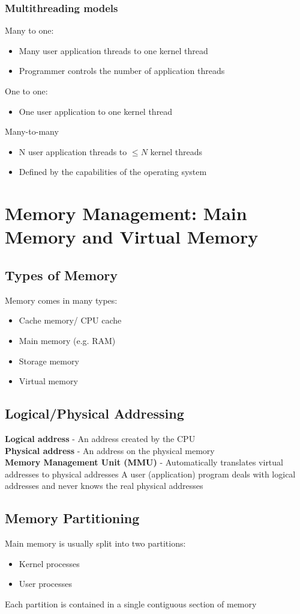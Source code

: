 \documentclass{article}[18pt]
\begin{document}
\subsubsection{Multithreading models}
Many to one:
\begin{itemize}
	\item Many user application threads to one kernel thread
	\item Programmer controls the number of application threads
\end{itemize}
One to one:
\begin{itemize}
	\item One user application to one kernel thread
\end{itemize}
Many-to-many
\begin{itemize}
	\item N user application threads to $\leqslant N$ kernel threads
	\item Defined by the capabilities of the operating system
\end{itemize}
\section{Memory Management: Main Memory and Virtual Memory}
\subsection{Types of Memory}
Memory comes in many types:
\begin{itemize}
	\item Cache memory/ CPU cache
	\item Main memory (e.g. RAM)
	\item Storage memory
	\item Virtual memory
\end{itemize}
\subsection{Logical/Physical Addressing}
\textbf{Logical address} - An address created by the CPU\\
\textbf{Physical address} - An address on the physical memory\\
\textbf{Memory Management Unit (MMU)} - Automatically translates virtual addresses to physical addresses
A user (application) program deals with logical addresses and never knows the real physical addresses
\subsection{Memory Partitioning}
Main memory is usually split into two partitions:
\begin{itemize}
	\item Kernel processes
	\item User processes
\end{itemize}
Each partition is contained in a single contiguous section of memory
\end{document}
